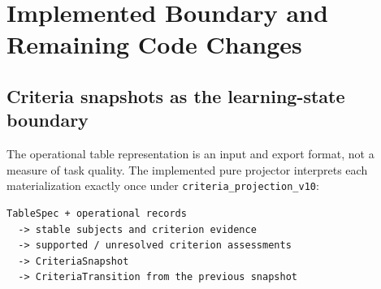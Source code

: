 \documentclass[11pt]{article}
\newcommand{\action}[1]{\texttt{#1}}
\begin{document}
\section{Implemented Boundary and Remaining Code Changes}

\subsection{Criteria snapshots as the learning-state boundary}

The operational table representation is an input and export format, not a
measure of task quality.  The implemented pure projector interprets each
materialization exactly once under \action{criteria\_projection\_v10}:

\begin{verbatim}
TableSpec + operational records
  -> stable subjects and criterion evidence
  -> supported / unresolved criterion assessments
  -> CriteriaSnapshot
  -> CriteriaTransition from the previous snapshot
\end{verbatim}
\end{document}
